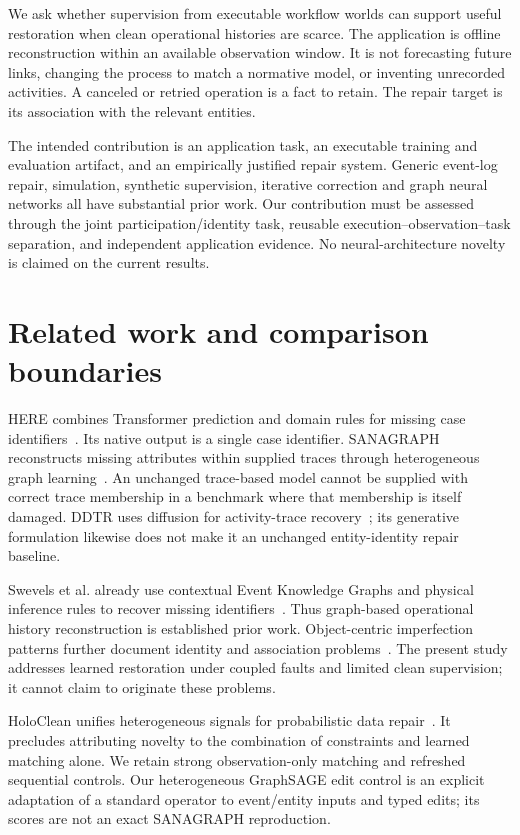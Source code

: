 \documentclass[11pt]{article}
\begin{document}
We ask whether supervision from executable workflow worlds can support useful restoration when clean operational histories are scarce. The application is offline reconstruction within an available observation window. It is not forecasting future links, changing the process to match a normative model, or inventing unrecorded activities. A canceled or retried operation is a fact to retain. The repair target is its association with the relevant entities.

The intended contribution is an application task, an executable training and evaluation artifact, and an empirically justified repair system. Generic event-log repair, simulation, synthetic supervision, iterative correction and graph neural networks all have substantial prior work. Our contribution must be assessed through the joint participation/identity task, reusable execution--observation--task separation, and independent application evidence. No neural-architecture novelty is claimed on the current results.

\section{Related work and comparison boundaries}
HERE combines Transformer prediction and domain rules for missing case identifiers~\cite{here}. Its native output is a single case identifier. SANAGRAPH reconstructs missing attributes within supplied traces through heterogeneous graph learning~\cite{sanagraph}. An unchanged trace-based model cannot be supplied with correct trace membership in a benchmark where that membership is itself damaged. DDTR uses diffusion for activity-trace recovery~\cite{ddtr}; its generative formulation likewise does not make it an unchanged entity-identity repair baseline.

Swevels et al. already use contextual Event Knowledge Graphs and physical inference rules to recover missing identifiers~\cite{ekginference}. Thus graph-based operational history reconstruction is established prior work. Object-centric imperfection patterns further document identity and association problems~\cite{ocip}. The present study addresses learned restoration under coupled faults and limited clean supervision; it cannot claim to originate these problems.

HoloClean unifies heterogeneous signals for probabilistic data repair~\cite{holoclean}. It precludes attributing novelty to the combination of constraints and learned matching alone. We retain strong observation-only matching and refreshed sequential controls. Our heterogeneous GraphSAGE edit control is an explicit adaptation of a standard operator to event/entity inputs and typed edits; its scores are not an exact SANAGRAPH reproduction.
\end{document}
